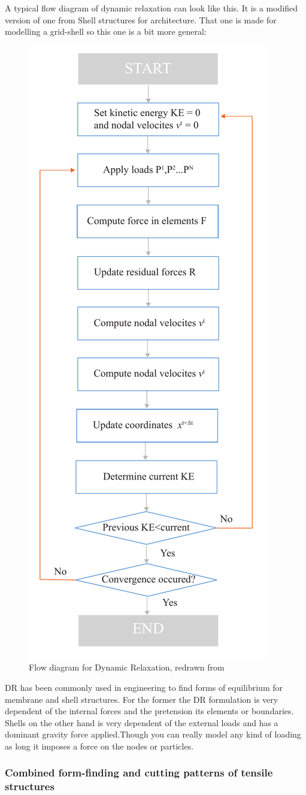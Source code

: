 A typical flow diagram of dynamic relaxation can look like this. It is a modified version of one from Shell structures for architecture. That one is made for modelling a grid-shell so this one is a bit more general:

\begin{figure}[H]
\centering
\includegraphics[height=1.2\linewidth ]{figure/Theory/DRScheme.pdf}
\caption{Flow diagram for Dynamic Relaxation, redrawn from \cite{ref:ShellOpt} }
\end{figure}

DR has been commonly used in engineering to find forms of equilibrium for membrane and shell structures. For the former the DR formulation is very dependent of the internal forces and the pretension its elements or boundaries. Shells on the other hand is very dependent of the external loads and has a dominant gravity force applied.Though you can really model any kind of loading as long it imposes a force on the nodes or particles. 

\subsubsection{Combined form-finding and cutting patterns of tensile structures}

